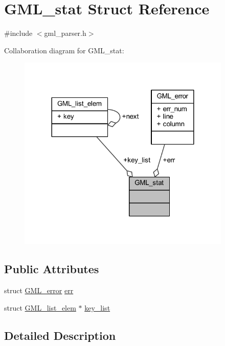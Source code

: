 \hypertarget{struct_g_m_l__stat}{}\section{G\+M\+L\+\_\+stat Struct Reference}
\label{struct_g_m_l__stat}


{\ttfamily \#include $<$gml\+\_\+parser.\+h$>$}



Collaboration diagram for G\+M\+L\+\_\+stat\+:\nopagebreak
\begin{figure}[H]
\begin{center}
\leavevmode
\includegraphics[width=288pt]{struct_g_m_l__stat__coll__graph}
\end{center}
\end{figure}
\subsection*{Public Attributes}
\begin{DoxyCompactItemize}
\item 
struct \mbox{\hyperlink{struct_g_m_l__error}{G\+M\+L\+\_\+error}} \mbox{\hyperlink{struct_g_m_l__stat_afa0e8f9827fda2e60f3a5c7965a464b2}{err}}
\item 
struct \mbox{\hyperlink{struct_g_m_l__list__elem}{G\+M\+L\+\_\+list\+\_\+elem}} $\ast$ \mbox{\hyperlink{struct_g_m_l__stat_a3c6317b5ad431531fea5a16bc64490dd}{key\+\_\+list}}
\end{DoxyCompactItemize}


\subsection{Detailed Description}


